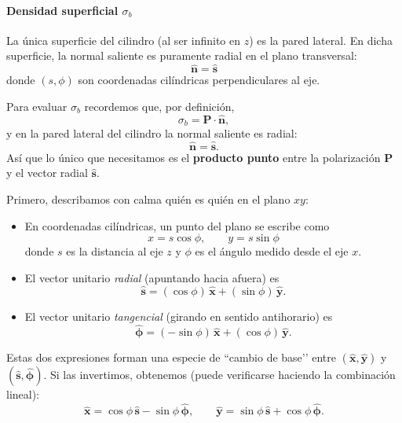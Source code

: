 \documentclass{article}
\begin{document}
\paragraph{Densidad superficial $\sigma_{b}$}

La única superficie del cilindro (al ser infinito en $z$) es la pared lateral. 
En dicha superficie, la normal saliente es puramente radial en el plano 
transversal:
\begin{equation}
\hat{\mathbf{n}} = \hat{\mathbf{s}}
\label{eq:n-hat-cilindro}
\end{equation}
donde $(s,\phi)$ son coordenadas cilíndricas perpendiculares al eje.

Para evaluar $\sigma_{b}$ recordemos que, por definición,
\[
\sigma_{b} = \mathbf{P}\cdot\hat{\mathbf{n}},
\]
y en la pared lateral del cilindro la normal saliente es radial:
\[
\hat{\mathbf{n}} = \hat{\mathbf{s}}.
\]
Así que lo único que necesitamos es el \textbf{producto punto} entre la
polarización $\mathbf{P}$ y el vector radial $\hat{\mathbf{s}}$.

\medskip

Primero, describamos con calma quién es quién en el plano $xy$:

\begin{itemize}
  \item En coordenadas cilíndricas, un punto del plano se escribe como
  \[
  x = s\cos\phi,
  \qquad
  y = s\sin\phi
  \]
  donde $s$ es la distancia al eje $z$ y $\phi$ es el ángulo medido desde el eje $x$.
  
  \item El vector unitario \emph{radial} (apuntando hacia afuera) es
  \[
  \hat{\mathbf{s}} = (\cos\phi)\,\hat{\mathbf{x}} + (\sin\phi)\,\hat{\mathbf{y}}.
  \]
  
  \item El vector unitario \emph{tangencial} (girando en sentido antihorario) es
  \[
  \hat{\boldsymbol{\phi}} = (-\sin\phi)\,\hat{\mathbf{x}} + (\cos\phi)\,\hat{\mathbf{y}}.
  \]
\end{itemize}

Estas dos expresiones forman una especie de “cambio de base’’ entre
$(\hat{\mathbf{x}},\hat{\mathbf{y}})$ y $(\hat{\mathbf{s}},\hat{\boldsymbol{\phi}})$.
Si las invertimos, obtenemos (puede verificarse haciendo la combinación lineal):
\begin{equation}
\hat{\mathbf{x}} = \cos\phi\,\hat{\mathbf{s}} - \sin\phi\,\hat{\boldsymbol{\phi}},
\qquad
\hat{\mathbf{y}} = \sin\phi\,\hat{\mathbf{s}} + \cos\phi\,\hat{\boldsymbol{\phi}}.
\label{eq:x-y-en-cilindricas-detallado}
\end{equation}
\end{document}
